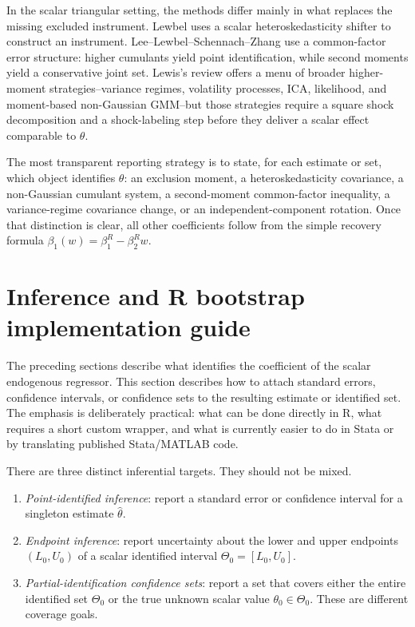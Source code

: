 \documentclass[11pt]{article}
\theoremstyle{plain}
\theoremstyle{definition}
\theoremstyle{remark}
\begin{document}
In the scalar triangular setting, the methods differ mainly in what replaces the
missing excluded instrument. Lewbel uses a scalar heteroskedasticity shifter to
construct an instrument. Lee--Lewbel--Schennach--Zhang use a common-factor error
structure: higher cumulants yield point identification, while second moments
yield a conservative joint set. Lewis's review offers a menu of broader
higher-moment strategies--variance regimes, volatility processes, ICA,
likelihood, and moment-based non-Gaussian GMM--but those strategies require a
square shock decomposition and a shock-labeling step before they deliver a
scalar effect comparable to $\theta$.

The most transparent reporting strategy is to state, for each estimate or set,
which object identifies $\theta$: an exclusion moment, a heteroskedasticity
covariance, a non-Gaussian cumulant system, a second-moment common-factor
inequality, a variance-regime covariance change, or an independent-component
rotation. Once that distinction is clear, all other coefficients follow from the
simple recovery formula $\beta_1(w)=\beta_1^R-\beta_2^Rw$.



\clearpage
\section{Inference and R bootstrap implementation guide}
\label{sec:r-bootstrap-guide}

The preceding sections describe what identifies the coefficient of the scalar
endogenous regressor.  This section describes how to attach standard errors,
confidence intervals, or confidence sets to the resulting estimate or identified
set.  The emphasis is deliberately practical: what can be done directly in R,
what requires a short custom wrapper, and what is currently easier to do in Stata
or by translating published Stata/MATLAB code.

There are three distinct inferential targets.  They should not be mixed.
\begin{enumerate}
    \item \emph{Point-identified inference}: report a standard error or
    confidence interval for a singleton estimate $\hat\theta$.
    \item \emph{Endpoint inference}: report uncertainty about the lower and
    upper endpoints $(L_0,U_0)$ of a scalar identified interval
    $\Theta_0=[L_0,U_0]$.
    \item \emph{Partial-identification confidence sets}: report a set that
    covers either the entire identified set $\Theta_0$ or the true unknown
    scalar value $\theta_0\in\Theta_0$.  These are different coverage goals.
\end{enumerate}
\end{document}
